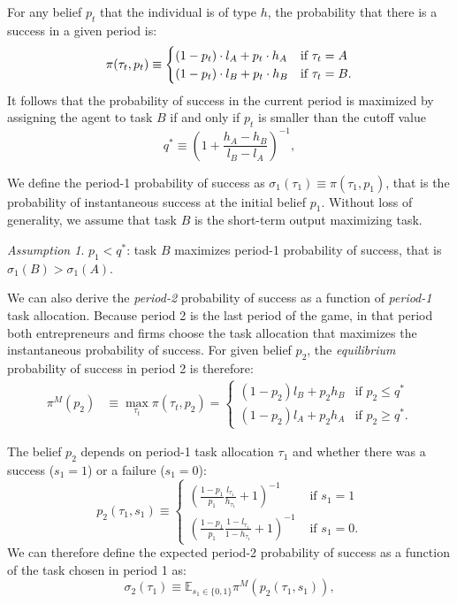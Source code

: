 \documentclass[12pt,american]{paper}
\theoremstyle{remark}
\newtheorem{ass}{Assumption}
\begin{document}
For any  belief  $p_t$  that the individual is of type $h$, the probability that there is a success in a given period is: 
\begin{equation}\label{eq:pr of success}
\pi(\tau_t,p_t)\equiv \begin{cases}
(1-p_t)\cdot l_A + p_t \cdot h_A  &\mbox{if } \tau_t=A\\
(1-p_t) \cdot l_B + p_t \cdot h_B  &\mbox{if } \tau_t=B.
\end{cases}\notag
\end{equation}
%
It follows that the probability of success in the current period is maximized by assigning the agent to task $B$ if and only if $p_t$ is smaller than the cutoff value
\begin{equation}
q^* \equiv \left(1+ \frac{h_A-h_B}{l_B-l_A} \right)^{-1},
\end{equation}
%

We define the period-1 probability of success as  $\sigma_1(\tau_1) \equiv \pi(\tau_1,p_1)$, that is the probability of instantaneous success at the initial belief $p_1$. Without loss of generality, we assume that task $B$ is the short-term output maximizing task.
\begin{ass}\label{ass:sigma1}
$p_1<q^*$: task $B$ maximizes period-1 probability of success, that is $\sigma_1(B)>\sigma_1(A)$.
\end{ass}
We can also derive the \textit{period-2} probability of success as a function of \textit{period-1} task allocation. Because period 2 is the last period of the game, in that period both entrepreneurs and firms choose the task allocation that maximizes the instantaneous probability of success. For given belief $p_2$, the \textit{equilibrium} probability of success in period 2 is therefore:
\begin{align}\label{maxp}
\pi^M(p_2)&\equiv\max_{\tau_t}\pi(\tau_t,p_2)
=\begin{cases} 
(1-p_2) l_B + p_2 h_B &\mbox{if } p_2 \leq q^*\\
(1-p_2) l_A + p_2 h_A & \mbox{if } p_2 \geq q^* .
\end{cases}
\end{align}

The belief $p_2$ depends on period-1 task allocation $\tau_1$ and whether there was a success ($s_1=1$) or a failure ($s_1=0$):
\[p_2(\tau_1,s_1)\equiv \begin{cases} 
\left(\frac{1-p_1}{p_1}\frac{l_{\tau_1}}{h_{\tau_1}}+1\right)^{-1} &\mbox{ if } s_1=1\\
\left(\frac{1-p_1}{p_1}\frac{1-l_{\tau_1}}{1-h_{\tau_1}}+1\right)^{-1} &\mbox{ if } s_1=0.
\end{cases}
\]
We can therefore define the expected period-2 probability of success as a function of the task chosen in period 1 as:
\begin{equation*}
\sigma_2(\tau_1) \equiv \mathbb E_{s_1\in\{0,1\}}\pi^M (p_2(\tau_1,s_1)),
\end{equation*}
\end{document}

